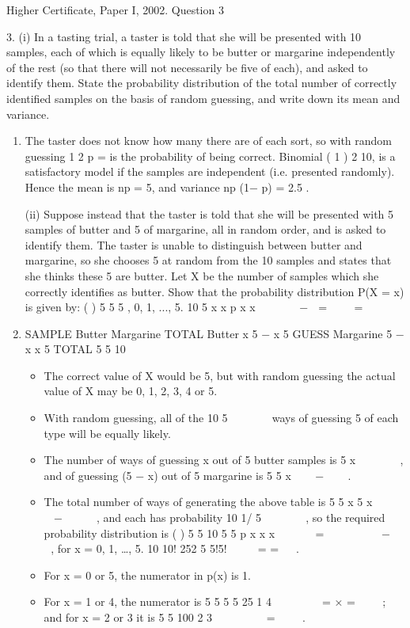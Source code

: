 \documentclass[a4paper,12pt]{article}
\begin{document}
Higher Certificate, Paper I, 2002. Question 3

\begin{framed}
3. (i) In a tasting trial, a taster is told that she will be presented with 10 samples,
each of which is equally likely to be butter or margarine independently of
the rest (so that there will not necessarily be five of each), and asked to
identify them. State the probability distribution of the total number of
correctly identified samples on the basis of random guessing, and write
down its mean and variance.

\end{framed}



\begin{enumerate}
\item The taster does not know how many there are of each sort, so with random
guessing 1
2 p = is the probability of being correct. Binomial ( 1 )
2 10, is a satisfactory
model if the samples are independent (i.e. presented randomly). Hence the mean is np
= 5, and variance np (1− p) = 2.5 .
\newpage
\begin{framed}
(ii) Suppose instead that the taster is told that she will be presented with 5
samples of butter and 5 of margarine, all in random order, and is asked to
identify them. The taster is unable to distinguish between butter and
margarine, so she chooses 5 at random from the 10 samples and states that
she thinks these 5 are butter. Let X be the number of samples which she
correctly identifies as butter. Show that the probability distribution
P(X = x) is given by:
( )
5 5
5
, 0, 1, ..., 5.
10
5
x x
p x x
  
  −  =    =
 
 
 

\end{framed}
\item  SAMPLE
Butter Margarine TOTAL
Butter x 5 − x 5
GUESS Margarine 5 − x x 5
TOTAL 5 5 10

\begin{itemize}
\item The correct value of X would be 5, but with random guessing the actual value of X
may be 0, 1, 2, 3, 4 or 5.
\item With random guessing, all of the
10
5
 
 
 
ways of guessing 5
of each type will be equally likely. 
\item The number of ways of guessing x out of 5 butter
samples is
5
x
 
 
 
, and of guessing (5 − x) out of 5 margarine is
5
5 x
 
 −   
. 
\item The total
number of ways of generating the above table is
5 5
x 5 x
  
  −    
, and each has probability
10
1/
5
 
 
 
, so the required probability distribution is ( ) 5 5 10
5 5
p x
x x
    
=        −   
, for
x = 0, 1, …, 5.
10 10! 252
5 5!5!
 
  = =
 
. 
\item For x = 0 or 5, the numerator in p(x) is 1. \item For x = 1 or 4, the
numerator is
5 5
5 5 25
1 4
  
   = × =
  
; and for x = 2 or 3 it is
5 5
100
2 3
  
    =
  
. 
\end{itemize}


\end{enumerate}
\end{document}
